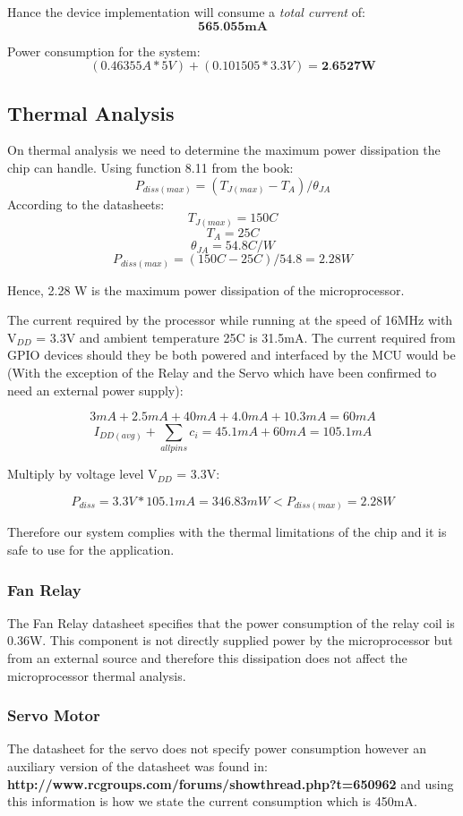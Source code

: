 		Hance the device implementation will consume a \emph{total current} of:
		$$ \textbf{565.055mA} $$
			
		Power consumption for the system:
		$$ (0.46355A * 5V) + (0.101505 * 3.3V) =  \textbf{2.6527W} $$

	\subsection{Thermal Analysis}
	
		On thermal analysis we need to determine the maximum power dissipation the chip can handle. Using function 8.11 from the book:
				$$P_{diss(max)}=(T_{J(max)}-T_{A})/\theta_{JA}$$
		According to the datasheets:
				$$T_{J(max)} = 150 C$$
				$$T_{A} = 25 C$$
				$$\theta_{JA}=54.8 C/W$$
				$$P_{diss(max)}=(150C-25C) / 54.8 = 2.28 W $$

		Hence, 2.28 W is the maximum power dissipation of the microprocessor.

		The current required by the processor while running at the speed of 16MHz with V$_{DD}$ = 3.3V and ambient temperature 25C is 31.5mA. The current required from GPIO devices should they be both powered and interfaced by the MCU would be (With the exception of the Relay and the Servo which have been confirmed to need an external power supply):

			$$  3mA + 2.5mA + 40mA + 4.0mA + 10.3mA = 60mA$$
			$$I_{DD(avg)} + \sum_{allpins}^{} c_i = 45.1mA + 60mA = 105.1mA$$

		Multiply by voltage level V$_{DD}$ = 3.3V:

			$$P_{diss}= 3.3V * 105.1mA = 346.83 mW < P_{diss(max)}= 2.28 W$$

		Therefore our system complies with the thermal limitations of the chip and it is safe to use for the application.


	\subsubsection{Fan Relay}

		The Fan Relay datasheet specifies that the power consumption of the relay coil is 0.36W. This component is not directly supplied power by the microprocessor but from an external source and therefore this dissipation does not affect the microprocessor thermal analysis.

	\subsubsection{Servo Motor}
		The datasheet for the servo does not specify power consumption however an auxiliary version of the datasheet was found in: \textbf{http://www.rcgroups.com/forums/showthread.php?t=650962} and using this information is how we state the current consumption which is 450mA. 


